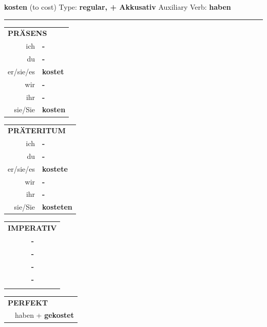 \documentclass[10pt,a4paper]{revtex4-2}
\begin{document}
\begin{verbbox-acc}
    {\Large \bf kosten} (to cost) \hfill Type: \textbf{regular, + Akkusativ} \hfill Auxiliary Verb: \textbf{haben} 
    
     \vspace{5pt}

    \hrule
    
    \vspace{5pt}

  \begin{tabular}{rl}
     \multicolumn{2}{l}{\textbf{PRÄSENS} }\\
    ich & \textbf{-}\\
    du & \textbf{-}\\
    er/sie/es & \textbf{kostet}\\
    wir & \textbf{-}\\
    ihr & \textbf{-}\\
    sie/Sie & \textbf{kosten}\\
  \end{tabular}
  \hfill
     \begin{tabular}{rl}
    \multicolumn{2}{l}{\textbf{PRÄTERITUM} }\\
    ich & \textbf{-}\\
    du & \textbf{-}\\
    er/sie/es & \textbf{kostete}\\
    wir & \textbf{-}\\
    ihr & \textbf{-}\\
    sie/Sie & \textbf{kosteten}\\
  \end{tabular}
  \hfill
  \begin{tabular}{rl}
     \multicolumn{2}{l}{\textbf{IMPERATIV} }\\
   & \textbf{-}\\
   & \textbf{-}\\
   & \textbf{-}\\
   & \textbf{-}\\
   & \vspace{10pt}
  \end{tabular}

    \vspace{10pt}

 \begin{tabular}{rl}
     \multicolumn{2}{l}{\textbf{PERFEKT}}\\
   & haben + \textbf{gekostet}\\
  \end{tabular}
\hfill
   \begin{tabular}{rl}
   

\end{tabular}
\end{verbbox-acc}
\end{document}
